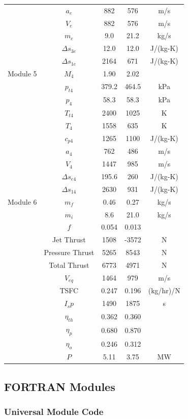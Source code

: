 \documentclass[conf]{new-aiaa} %
\begin{document}
\begin{longtable}[c]{lcccc}
    & $a_e$& 882& 576& m/s\\
    & $V_e$& 882& 576& m/s\\
    & $m_e$& 9.0& 21.2& kg/s\\
    & $\Delta s_{3e}$& 12.0& 12.0& J/(kg-K)\\
    & $\Delta s_{1e}$& 2164& 671& J/(kg-K)\\\hline
    Module 5& $M_4$& 1.90& 2.02\\
    & $p_{t4}$& 379.2& 464.5& kPa\\
    & $p_4$& 58.3& 58.3& kPa\\
    & $T_{t4}$& 2400& 1025& K\\
    & $T_4$& 1558& 635& K\\
    & $c_{p4}$& 1265& 1100& J/(kg-K)\\
    & $a_4$& 762& 486& m/s\\
    & $V_4$& 1447& 985& m/s\\
    & $\Delta s_{e4}$& 195.6& 260& J/(kg-K)\\
    & $\Delta s_{14}$& 2630& 931& J/(kg-K)\\\hline
    Module 6& $m_f$& 0.46& 0.27& kg/s\\
    & $m_i$& 8.6& 21.0& kg/s\\
    & $f$& 0.054& 0.013\\
    & Jet Thrust& 1508& -3572& N\\
    & Pressure Thrust& 5265& 8543& N\\
    & Total Thrust& 6773& 4971& N\\
    & $V_{eq}$& 1464& 979& m/s\\
    & TSFC& 0.247& 0.196& (kg/hr)/N\\
    & $I_sp$& 1490& 1875& s\\
    & $\eta_{th}$& 0.362& 0.360\\
    & $\eta_p$& 0.680& 0.870\\
    & $\eta_o$& 0.246& 0.312\\
    & $P$& 5.11& 3.75& MW\\
    \hline
\end{longtable}

\subsection{FORTRAN Modules}
\subsubsection{Universal Module Code}

\end{document}
